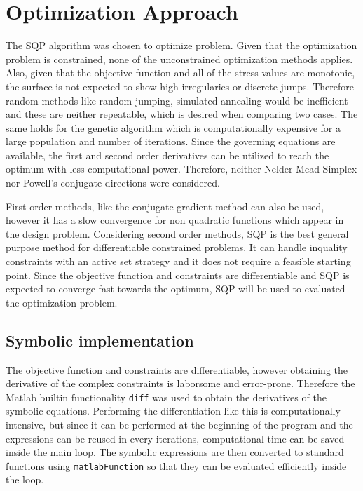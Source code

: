 \section{Optimization Approach}
The SQP algorithm was chosen to optimize problem. 
Given that the optimization problem is constrained, none of the unconstrained optimization methods applies.
Also, given that the objective function and all of the stress values are monotonic, the surface is not expected to show high irregularies or discrete jumps. Therefore random methods like random jumping, simulated annealing would be inefficient and these are neither repeatable, which is desired when comparing two cases. The same holds for the genetic algorithm which is computationally expensive for a large population and number of iterations.
Since the governing equations are available, the first and second order derivatives can be utilized to reach the optimum with less computational power. Therefore, neither Nelder-Mead Simplex nor Powell’s conjugate directions were considered.

First order methods, like the conjugate gradient method can also be used, however it has a slow convergence for non quadratic functions which appear in the design problem. Considering second order methods, SQP is the best general purpose method for differentiable constrained problems. It can handle inquality constraints with an active set strategy and it does not require a feasible starting point. Since the objective function and constraints are differentiable and SQP is expected to converge fast towards the optimum, SQP will be used to evaluated the optimization problem.
 



\subsection{Symbolic implementation}

\newcommand{\xvec}{\mathbf{x}}
\newcommand{\hvec}{\mathbf{h}}
\newcommand{\gvec}{\mathbf{g}}
\newcommand{\Wmat}{\mathbf{W}}
\newcommand{\Amat}{\mathbf{A}}
\newcommand{\lamvec}{\bm{\lambda}}

The objective function and constraints are differentiable, however obtaining the derivative of the complex constraints is laborsome and error-prone.
Therefore the Matlab builtin functionality \verb|diff| was used to obtain the derivatives of the symbolic equations.
Performing the differentiation like this is computationally intensive, but since it can be performed at the beginning of the program and the expressions can be reused in every iterations, computational time can be saved inside the main loop.
The symbolic expressions are then converted to standard functions using \verb|matlabFunction| so that they can be evaluated efficiently inside the loop.

